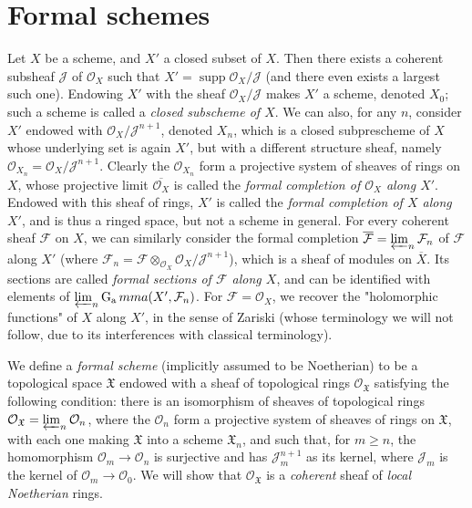 \section{Formal schemes}\label{fga2-2}

Let $X$ be a scheme, and $X'$ a closed subset of $X$.
Then there exists a coherent subsheaf $\mathcal{J}$ of $\mathcal{O}_X$ such that $X'=\operatorname{supp}\mathcal{O}_X/\mathcal{J}$ (and there even exists a largest such one).
Endowing $X'$ with the sheaf $\mathcal{O}_X/\mathcal{J}$ makes $X'$ a scheme, denoted $X_0$;
such a scheme is called a \emph{closed subscheme of $X$}.
We can also, for any $n$, consider $X'$ endowed with $\mathcal{O}_X/\mathcal{J}^{n+1}$, denoted $X_n$, which is a closed subprescheme of $X$ whose underlying set is again $X'$, but with a different structure sheaf, namely $\mathcal{O}_{X_n}=\mathcal{O}_X/\mathcal{J}^{n+1}$.
Clearly the $\mathcal{O}_{X_n}$ form a projective system of sheaves of rings on $X$, whose projective limit $\overline{\mathcal{O}_X}$ is called the \emph{formal completion of $\mathcal{O}_X$ along $X'$}.
Endowed with this sheaf of rings, $X'$ is called the \emph{formal completion of $X$ along $X'$}, and is thus a ringed space, but not a scheme in general.
For every coherent sheaf $\mathcal{F}$ on $X$, we can similarly consider the formal completion $\overline{\mathcal{F}}=\varprojlim_n\mathcal{F}_n$ of $\mathcal{F}$ along $X'$ (where $\mathcal{F}_n=\mathcal{F}\otimes_{\mathcal{O}_X}\mathcal{O}_X/\mathcal{J}^{n+1}$), which is a sheaf of modules on $\overline{X}$.
Its sections are called \emph{formal sections of $\mathcal{F}$ along $X$}, and can be identified with elements of $\varprojlim_n\operatorname{G_a}mma(X',\mathcal{F}_n)$.
For $\mathcal{F}=\mathcal{O}_X$, we recover the "holomorphic functions" of $X$ along $X'$, in the sense of Zariski (whose terminology we will not follow, due to its interferences with classical terminology).

We define a \emph{formal scheme} (implicitly assumed to be Noetherian) to be a topological space $\mathfrak{X}$ endowed with a sheaf of topological rings $\mathcal{O}_{\mathfrak{X}}$ satisfying the following condition:
there is an isomorphism of sheaves of topological rings $\mathcal{O}_{\mathfrak{X}}=\varprojlim_n\mathcal{O}_n$, where the $\mathcal{O}_n$ form a projective system of sheaves of rings on $\mathfrak{X}$, with each one making $\mathfrak{X}$ into a scheme $\mathfrak{X}_n$, and such that, for $m\geqslant n$, the homomorphism $\mathcal{O}_m\to\mathcal{O}_n$ is surjective and has $\mathcal{J}_m^{n+1}$ as its kernel, where $\mathcal{J}_m$ is the kernel of $\mathcal{O}_m\to\mathcal{O}_0$.
We will show that $\mathcal{O}_{\mathfrak{X}}$ is a \emph{coherent} sheaf of \emph{local Noetherian} rings.

